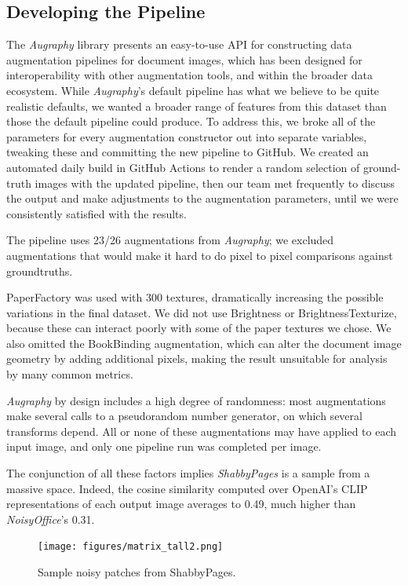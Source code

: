\documentclass[runningheads]{llncs}
\begin{document}
\subsection{Developing the Pipeline}
The \emph{Augraphy} library presents an easy-to-use API for constructing data augmentation pipelines for document images, which has been designed for interoperability with other augmentation tools, and within the broader data ecosystem.
While \emph{Augraphy}'s default pipeline has what we believe to be quite realistic defaults, we wanted a broader range of features from this dataset than those the default pipeline could produce.
To address this, we broke all of the parameters for every augmentation constructor out into separate variables, tweaking these and committing the new pipeline to GitHub.
We created an automated daily build in GitHub Actions to render a random selection of ground-truth images with the updated pipeline, then our team met frequently to discuss the output and make adjustments to the augmentation parameters, until we were consistently satisfied with the results.

The pipeline uses 23/26 augmentations from \emph{Augraphy}; we excluded augmentations that would make it hard to do pixel to pixel comparisons against groundtruths.

PaperFactory was used with 300 textures, dramatically increasing the possible variations in the final dataset. We did not use Brightness or BrightnessTexturize, because these can interact poorly with some of the paper textures we chose. We also omitted the BookBinding augmentation, which can alter the document image geometry by adding additional pixels, making the result unsuitable for analysis by many common metrics.

\emph{Augraphy} by design includes a high degree of randomness: most augmentations make several calls to a pseudorandom number generator, on which several transforms depend.
All or none of these augmentations may have applied to each input image, and only one pipeline run was completed per image.

The conjunction of all these factors implies \emph{ShabbyPages} is a sample from a massive space.
Indeed, the cosine similarity computed over OpenAI's CLIP representations of each output image averages to 0.49, much higher than \emph{NoisyOffice}'s 0.31.

\begin{figure}
    \texttt{[image: figures/matrix\_tall2.png]}
    \caption{Sample noisy patches from ShabbyPages.}
    \label{fig:matrix_tall2}
\end{figure}
\end{document}
